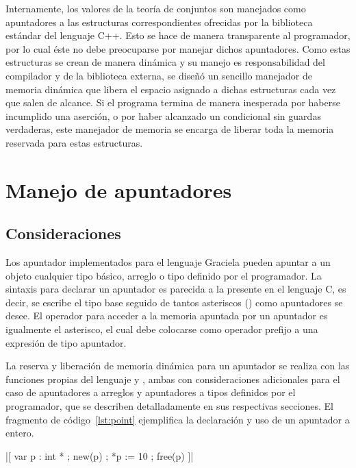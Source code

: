{{Internamente, los valores de la teoría de conjuntos son manejados como
apuntadores a las estructuras correspondientes ofrecidas por la biblioteca
estándar del lenguaje C++. Esto se hace de manera transparente al programador,
por lo cual éste no debe preocuparse por manejar dichos apuntadores. Como  estas
estructuras se crean de manera dinámica y su manejo es responsabilidad del
compilador y de la biblioteca externa, se diseñó un sencillo manejador de
memoria dinámica que libera el espacio asignado a dichas estructuras cada vez
que salen de alcance. Si el programa termina de manera inesperada por haberse
incumplido una aserción, o por haber alcanzado un condicional sin guardas
verdaderas, este manejador de memoria se encarga de liberar toda la memoria
reservada para estas estructuras.


\section{Manejo de apuntadores}

\subsection{Consideraciones}
Los apuntador implementados para el lenguaje Graciela pueden apuntar a un
objeto cualquier tipo básico, arreglo o tipo definido por el programador. La
sintaxis para declarar un apuntador es parecida a la presente en  el lenguaje
C, es decir, se escribe el tipo base seguido de tantos asteriscos (\ingra{*})
como apuntadores se desee. El operador para acceder a la memoria apuntada por
un apuntador es igualmente el asterisco, el cual debe colocarse como operador
prefijo a una expresión de tipo apuntador.

La reserva y liberación de memoria dinámica para un apuntador se realiza con las
funciones propias del lenguaje  y , ambas con
consideraciones adicionales para el caso de apuntadores a arreglos y apuntadores
a tipos definidos por el programador, que se describen detalladamente en sus
respectivas secciones. El fragmento de código~\ref{lst:point} ejemplifica la
declaración y uso de un apuntador a entero.

\begin{gracielacode}[caption=Uso de apuntadores, label=lst:point]
|[ var p : int *
 ;  new(p)
 ;  *p := 10
 ;  free(p)
]|
\end{gracielacode}

}}
